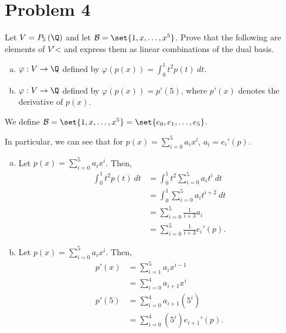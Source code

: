 \documentclass[12pt]{mypackage}
\begin{document}
\section{Problem 4}%
\begin{problem}
  Let $V = P_{5}\left(\Q\right)$ and let $\mathcal{B} = \set{1,x,\dots,x^5}$. Prove that the following are elements of $V'$< and express them as linear combinations of the dual basis.
  \begin{enumerate}[(a)]
    \item $\varphi: V\rightarrow \Q$ defined by $\varphi\left(p(x)\right) = \int_{0}^{1} t^2p(t)\:dt$.
    \item $\varphi: V\rightarrow \Q$ defined by $\varphi\left(p(x)\right) = p'(5)$, where $p'(x)$ denotes the derivative of $p(x)$.
  \end{enumerate}
\end{problem}
\begin{solution}
  We define $\mathcal{B} = \set{1,x,\dots,x^5} = \set{e_0,e_1,\dots,e_5}$.\newline

  In particular, we can see that for $p(x) =\sum_{i=0}^{5}a_ix^i$, $a_i = e_i'\left(p\right)$.
  \begin{enumerate}[(a)]
    \item Let $p(x) = \sum_{i=0}^{5}a_ix^i$. Then,
      \begin{align*}
        \int_{0}^{1} t^2p(t)\:dt &= \int_{0}^{1} t^2\sum_{i=0}^{5}a_it^i\:dt\\
                                 &= \int_{0}^{1} \sum_{i=0}^{5}a_it^{i+2}\:dt\\
                                 &= \sum_{i=0}^{5}\frac{1}{i+3}a_i\\
                                 &= \sum_{i=0}^{5}\frac{1}{i+3}e_i'\left(p\right).
      \end{align*}
    \item Let $p(x) = \sum_{i=0}^{5}a_ix^i$. Then,
      \begin{align*}
        p'(x) &= \sum_{i=1}^{5}a_ix^{i-1}\\
              &= \sum_{i=0}^{4}a_{i+1}x^{i}\\
        p'(5) &= \sum_{i=0}^{4}a_{i+1}\left(5^{i}\right)\\
              &= \sum_{i=0}^{4}\left(5^i\right)e_{i+1}'\left(p\right).
      \end{align*}
  \end{enumerate}
\end{solution}
\end{document}
